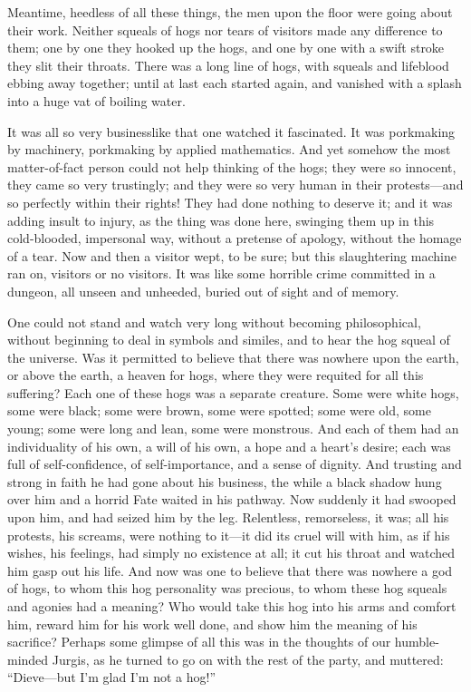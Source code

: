 \documentclass[
]{article}
\begin{document}
Meantime, heedless of all these things, the men upon the floor were going about their work. Neither squeals of hogs nor tears of visitors made any difference to them; one by one they hooked up the hogs, and one by one with a swift stroke they slit their throats. There was a long line of hogs, with squeals and lifeblood ebbing away together; until at last each started again, and vanished with a splash into a huge vat of boiling water.

It was all so very businesslike that one watched it fascinated. It was porkmaking by machinery, porkmaking by applied mathematics. And yet somehow the most matter-of-fact person could not help thinking of the hogs; they were so innocent, they came so very trustingly; and they were so very human in their protests---and so perfectly within their rights! They had done nothing to deserve it; and it was adding insult to injury, as the thing was done here, swinging them up in this cold-blooded, impersonal way, without a pretense of apology, without the homage of a tear. Now and then a visitor wept, to be sure; but this slaughtering machine ran on, visitors or no visitors. It was like some horrible crime committed in a dungeon, all unseen and unheeded, buried out of sight and of memory.

One could not stand and watch very long without becoming philosophical, without beginning to deal in symbols and similes, and to hear the hog squeal of the universe. Was it permitted to believe that there was nowhere upon the earth, or above the earth, a heaven for hogs, where they were requited for all this suffering? Each one of these hogs was a separate creature. Some were white hogs, some were black; some were brown, some were spotted; some were old, some young; some were long and lean, some were monstrous. And each of them had an individuality of his own, a will of his own, a hope and a heart's desire; each was full of self-confidence, of self-importance, and a sense of dignity. And trusting and strong in faith he had gone about his business, the while a black shadow hung over him and a horrid Fate waited in his pathway. Now suddenly it had swooped upon him, and had seized him by the leg. Relentless, remorseless, it was; all his protests, his screams, were nothing to it---it did its cruel will with him, as if his wishes, his feelings, had simply no existence at all; it cut his throat and watched him gasp out his life. And now was one to believe that there was nowhere a god of hogs, to whom this hog personality was precious, to whom these hog squeals and agonies had a meaning? Who would take this hog into his arms and comfort him, reward him for his work well done, and show him the meaning of his sacrifice? Perhaps some glimpse of all this was in the thoughts of our humble-minded Jurgis, as he turned to go on with the rest of the party, and muttered: ``Dieve---but I'm glad I'm not a hog!''
\end{document}
